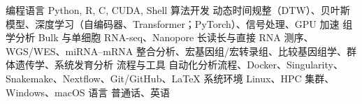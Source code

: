 
\begin{cvskills}
  \cvskill
    {编程语言}
    {Python, R, C, CUDA, Shell}
  \cvskill
    {算法开发}
    {动态时间规整（DTW）、贝叶斯模型、深度学习（自编码器、Transformer；PyTorch）、信号处理、GPU 加速}
  \cvskill
    {组学分析}
    {Bulk 与单细胞 RNA-seq、Nanopore 长读长与直接 RNA 测序、WGS/WES、miRNA--mRNA 整合分析、宏基因组/宏转录组、比较基因组学、群体遗传学、系统发育分析}
  \cvskill
    {流程与工具}
    {自动化分析流程、Docker、Singularity、Snakemake、Nextflow、Git/GitHub、LaTeX}
  \cvskill
    {系统环境}
    {Linux、HPC 集群、Windows、macOS}
  \cvskill
    {语言}
    {普通话、英语}
\end{cvskills}
